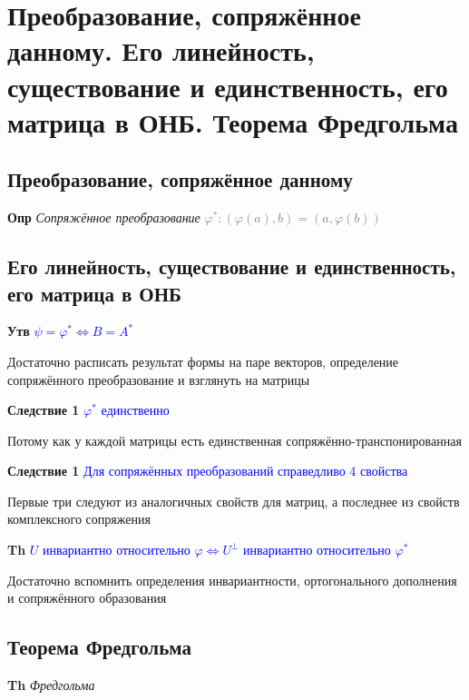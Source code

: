 \documentclass[a4paper, 14pt]{article}
\begin{document}
    \section{Преобразование, сопряжённое данному.
    Его линейность, существование и единственность, его матрица в ОНБ.
    Теорема Фредгольма}
    
    \subsection{Преобразование, сопряжённое данному}
    
    \textbf{Опр} \textit{Сопряжённое преобразование} \textcolor{gray}{$\varphi^*: (\varphi(a), b) = (a, \varphi(b))$}
    
    \subsection{Его линейность, существование и единственность, его матрица в ОНБ}

    
    \textbf{Утв} \textcolor{blue}{$\psi = \varphi^* \Leftrightarrow B = A^*$}
    
    Достаточно расписать результат формы на паре векторов, определение сопряжённого преобразование и взглянуть на
    матрицы
    
    \textbf{Следствие 1} \textcolor{blue}{$\varphi^*$ единственно}
    
    Потому как у каждой матрицы есть единственная сопряжённо-транспонированная
    
    \textbf{Следствие 1} \textcolor{blue}{Для сопряжённых преобразований справедливо 4 свойства}
    
    Первые три следуют из аналогичных свойств для матриц, а последнее из свойств комплексного сопряжения
    
    \textbf{Th} \textcolor{blue}{$U$ инвариантно относительно $\varphi \Leftrightarrow U^\bot$ инвариантно
    относительно $\varphi^*$}
    
    Достаточно вспомнить определения инвариантности, ортогонального дополнения и сопряжённого образования
    
    \subsection{Теорема Фредгольма}
    
    \textbf{Th} \textit{Фредгольма}
    
\end{document}
